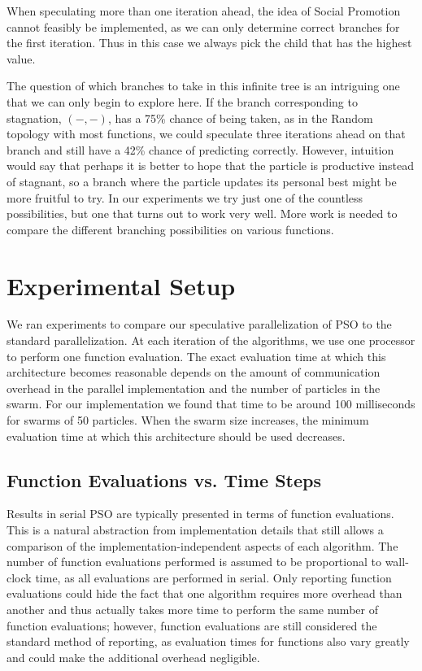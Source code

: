 \documentclass[ms,electronic,twosidetoc,letterpaper,chaptercenter,parttop,equalmargins]{byumsphd}
\providecommand{\casepn}{\ensuremath{(-,-)}}
\begin{document}
When speculating more than one iteration ahead, the idea of Social Promotion
cannot feasibly be implemented, as we can only determine correct branches for
the first iteration.  Thus in this case we always pick the child that has the
highest value.

The question of which branches to take in this infinite tree is an intriguing
one that we can only begin to explore here.  If the branch corresponding to
stagnation, \casepn, has a 75\% chance of being taken, as in the Random
topology with most functions, we could speculate three iterations ahead on that
branch and still have a 42\% chance of predicting correctly.  However,
intuition would say that perhaps it is better to hope that the particle is
productive instead of stagnant, so a branch where the particle updates its
personal best might be more fruitful to try.  In our experiments we try just
one of the countless possibilities, but one that turns out to work very well.
More work is needed to compare the different branching possibilities on various
functions.

\chapter{Experimental Setup}
\label{sec:setup}

We ran experiments to compare our speculative parallelization of PSO to the
standard parallelization.  At each iteration of the algorithms, we use one
processor to perform one function evaluation.  The exact evaluation time at
which this architecture becomes reasonable depends on the amount of
communication overhead in the parallel implementation and the number of
particles in the swarm.  For our implementation we found that time to be around
100 milliseconds for swarms of 50 particles.  When the swarm size increases,
the minimum evaluation time at which this architecture should be used
decreases.

\section{Function Evaluations vs. Time Steps}

Results in serial PSO are typically presented in terms of function evaluations.
This is a natural abstraction from implementation details that still allows a
comparison of the implementation-independent aspects of each algorithm.  The
number of function evaluations performed is assumed to be proportional to
wall-clock time, as all evaluations are performed in serial.  Only reporting
function evaluations could hide the fact that one algorithm requires more
overhead than another and thus actually takes more time to perform the same
number of function evaluations; however, function evaluations are still
considered the standard method of reporting, as evaluation times for functions
also vary greatly and could make the additional overhead negligible.
\end{document}
